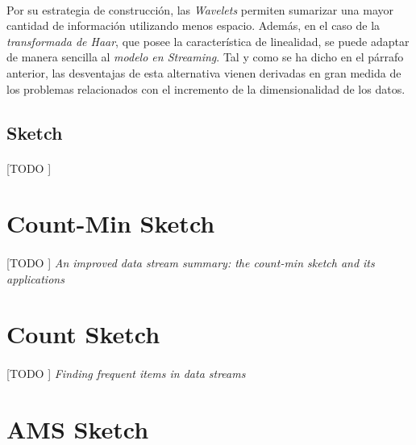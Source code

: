 \documentclass{subfiles}
\begin{document}
        \paragraph{}
        Por su estrategia de construcción, las \emph{Wavelets} permiten sumarizar una mayor cantidad de información utilizando menos espacio. Además, en el caso de la \emph{transformada de Haar}, que posee la característica de linealidad, se puede adaptar de manera sencilla al \emph{modelo en Streaming}. Tal y como se ha dicho en el párrafo anterior, las desventajas de esta alternativa vienen derivadas en gran medida de los problemas relacionados con el incremento de la dimensionalidad de los datos.

      \subsection{Sketch}
      \label{sec:sketch}

        \paragraph{}
        [TODO ]

    \section{Count-Min Sketch}
    \label{sec:count_min_sketch}

      \paragraph{}
      [TODO ] \emph{An improved data stream summary: the count-min sketch and its applications} \cite{cormode2005improved}

    \section{Count Sketch}
    \label{sec:count_sketch}

      \paragraph{}
      [TODO ] \emph{Finding frequent items in data streams} \cite{charikar2002finding}

    \section{AMS Sketch}
    \label{sec:ams_sketch}
\end{document}
